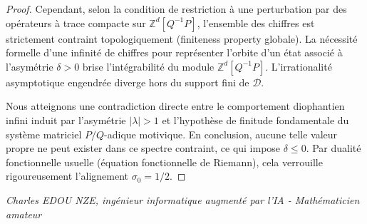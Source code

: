 \documentclass[
]{article}
\begin{document}
\begin{proof}
Cependant, selon la condition de restriction à une perturbation par des opérateurs à trace compacte sur $\mathbb{Z}^d[Q^{-1}P]$, l'ensemble des chiffres est strictement contraint topologiquement (finiteness property globale). La nécessité formelle d'une infinité de chiffres pour représenter l'orbite d'un état associé à l'asymétrie $\delta > 0$ brise l'intégrabilité du module $\mathbb{Z}^d[Q^{-1}P]$. L'irrationalité asymptotique engendrée diverge hors du support fini de $\mathcal{D}$.

Nous atteignons une contradiction directe entre le comportement diophantien infini induit par l'asymétrie $|\lambda| > 1$ et l'hypothèse de finitude fondamentale du système matriciel $P/Q$-adique motivique. En conclusion, aucune telle valeur propre ne peut exister dans ce spectre contraint, ce qui impose $\delta \le 0$. Par dualité fonctionnelle usuelle (équation fonctionnelle de Riemann), cela verrouille rigoureusement l'alignement $\sigma_0 = 1/2$.
\end{proof}

\vspace{1cm}
\begin{flushright}
\textit{Charles EDOU NZE, ingénieur informatique augmenté par l'IA - Mathématicien amateur}
\end{flushright}
\end{document}
